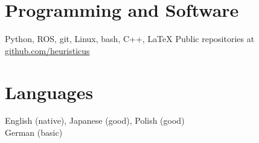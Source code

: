 \documentclass[a4paper,10pt]{article}
\begin{document}
\begin{minipage}[t]{0.47\textwidth}
  \section{Programming and Software}
  Python, ROS, git, Linux, bash, C++, \LaTeX
  \vskip 0.2cm
  Public repositories at \href{http://www.github.com/heuristicus}{github.com/heuristicus}
\end{minipage}
\textwidth
\begin{minipage}[t]{0.47\textwidth}
  \section{Languages}
    English (native), Japanese (good), Polish (good)\\German (basic)
\end{minipage}

\begin{comment}
\section{Referees}
Addresses and positions for referees are current. Bold text indicates
where the person supervised me.
\begin{center}
  \begin{tabular}{lll}
    \textbf{Oxford Robotics Institute} & \textbf{Oxford Robotics Institute} & \textbf{Oxford Robotics Institute}\\
    Nick Hawes& Maurice Fallon & David Marquez-Gamez \\
    Associate Professor in Engineering Science & Associate Professor in Engineering Science & Systems Team Lead\\
    nickh@robots.ox.ac.uk & mfallon@robots.ox.ac.uk & davidmg@robots.ox.ac.uk\\
    & Oxford Robotics Institute &  \rule{0pt}{0.5cm} \\
    & University of Oxford &  \\
    & 17 Parks Road, Oxford &  \\
    & OX1 3PJ & 
  \end{tabular}
  

\end{center}
\end{comment}
\end{document}
